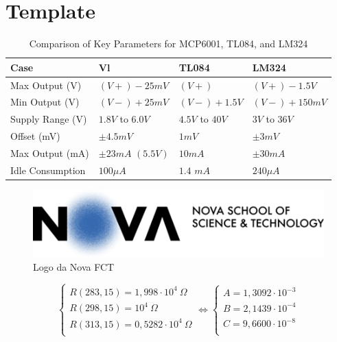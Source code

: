 \section{Template}

\begin{table}[h]
    \centering
    \caption{Comparison of Key Parameters for MCP6001, TL084, and LM324}
    \begin{tabularx}{\textwidth}{>{\centering\arraybackslash}X >{\centering\arraybackslash}X >{\centering\arraybackslash}X >{\centering\arraybackslash}X}
        \toprule
        \textbf{Case} & \textbf{Vl} & \textbf{TL084} & \textbf{LM324} \\
        \midrule
        Max Output (V) & $(V+)-25mV$ & $(V+)$ & $(V+) - 1.5V$ \\
        \midrule
        Min Output (V) & $(V-)+25mV$ & $(V-) + 1.5V$ & $(V-) + 150mV$ \\
        \midrule
        Supply Range (V) & $1.8V$ to $6.0V$ & $4.5V$ to $40V$ & $3V$ to $36V$ \\
        \midrule
        Offset (mV) & $\pm 4.5mV$ & $1mV$ & $\pm 3 mV$ \\
        \midrule
        Max Output (mA) & $\pm 23 mA$ $(5.5V)$ & $10 mA$ & $\pm 30 mA$ \\
        \midrule
        Idle Consumption & $100 \mu A $ & $1.4$ $mA$ & $240 \mu A$ \\
        \bottomrule
    \end{tabularx}
    \label{tab:opamp}
\end{table}
\begin{figure}[H]
    \centering
    \includegraphics*[scale = 0.05]{Images/NovaFctHor.png}
    \caption{Logo da Nova FCT}
    \label{wrap-fig:1}
\end{figure}

\begin{equation}
    \begin{cases}
    
        R( 283,15 ) = 1,998\cdot 10^4 ~\Omega \\
        R( 298,15 ) = 10^4 ~\Omega\\
        R( 313,15 ) = 0,5282 \cdot 10^4 ~\Omega\\
    
    \end{cases}
    \Leftrightarrow
    \begin{cases}
        A = 1,3092 \cdot 10^{-3}\\
        B = 2,1439 \cdot 10^{-4}\\
        C = 9,6600 \cdot 10^{-8}\\
    
    \end{cases}
\end{equation}

